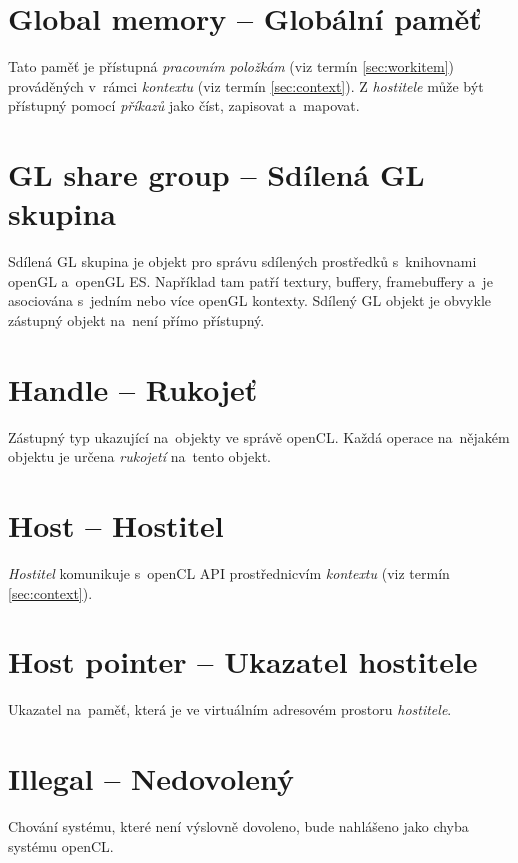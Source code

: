 \section{Global memory -- Globální paměť}
\label{sec:globalmemory}

Tato paměť je přístupná \emph{pracovním položkám} (viz termín \ref{sec:workitem}) prováděných v~rámci \emph{kontextu} (viz termín \ref{sec:context}). Z \emph{hostitele} může být přístupný pomocí \emph{příkazů} jako číst, zapisovat a~mapovat.


\section{GL share group -- Sdílená GL skupina}
\label{sec:glsharegroup}

Sdílená GL skupina je objekt pro správu sdílených prostředků s~knihovnami openGL a~openGL ES.
Například tam patří textury, buffery, framebuffery a~je asociována s~jedním nebo více openGL kontexty.
Sdílený GL objekt je obvykle zástupný objekt na~není
přímo přístupný.

\section{Handle -- Rukojeť}
\label{sec:handle}

Zástupný typ ukazující na~objekty ve správě openCL.
Každá operace  na~nějakém objektu je určena \emph{rukojetí} na~tento objekt.

\section{Host -- Hostitel}
\label{sec:host}

\emph{Hostitel} komunikuje s~openCL API prostřednicvím \emph{kontextu} (viz termín \ref{sec:context}).

\section{Host pointer -- Ukazatel hostitele}
\label{sec:hostpointer}

Ukazatel na~paměť, která je ve virtuálním adresovém prostoru \emph{hostitele}.

\section{Illegal -- Nedovolený}
\label{sec:illegal}

Chování systému, které není výslovně dovoleno, bude
nahlášeno jako chyba systému openCL.

